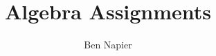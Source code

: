\documentclass[a4paper, answers]{exam}
\title{Algebra Assignments}
\author{Ben Napier}
\begin{document}
    \maketitle
    \begin{questions}
        
        
        
        
    \end{questions}
\end{document}
